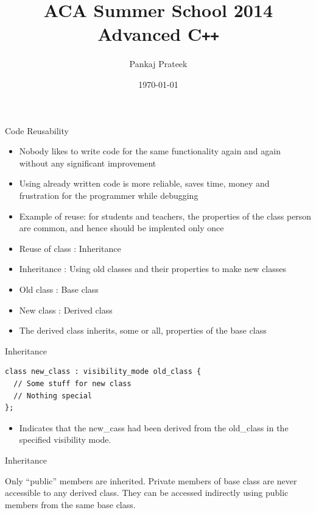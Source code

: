 \documentclass{beamer}
\title{ACA Summer School 2014\\ Advanced C\texttt{++}}
\author{Pankaj Prateek}
\institute{ACA, CSE, IIT Kanpur}
\date{\today}
\begin{document}
\begin{frame}
  \titlepage
\end{frame}

\begin{frame}[fragile]{Code Reusability}
  \begin{itemize}
  \item Nobody likes to write code for the same functionality again and again without any significant improvement\pause
  \item Using already written code is more reliable, saves time, money and frustration for the programmer while debugging\pause
  \item Example of reuse: for students and teachers, the properties of the class person are common, and hence should be implented only once\pause
  \item Reuse of class : Inheritance\pause
  \item Inheritance : Using old classes and their properties to make new classes\pause
  \item Old class : Base class\pause
  \item New class : Derived class\pause
  \item The derived class inherits, some or all, properties of the base class
  \end{itemize}
\end{frame}

\begin{frame}[fragile]{Inheritance}
  \begin{lstlisting}
class new_class : visibility_mode old_class {
  // Some stuff for new class
  // Nothing special
};
  \end{lstlisting}\pause
  \begin{itemize}
    \item Indicates that the new\_cass had been derived from the old\_class in the specified visibility mode.
  \end{itemize}
\end{frame}

\begin{frame}[fragile]{Inheritance}
  \item \alert{Only ``public'' members are inherited}. Private members of base class are never accessible to any derived class. They can be accessed indirectly using public members from the same base class.
\end{frame}
\end{document}
